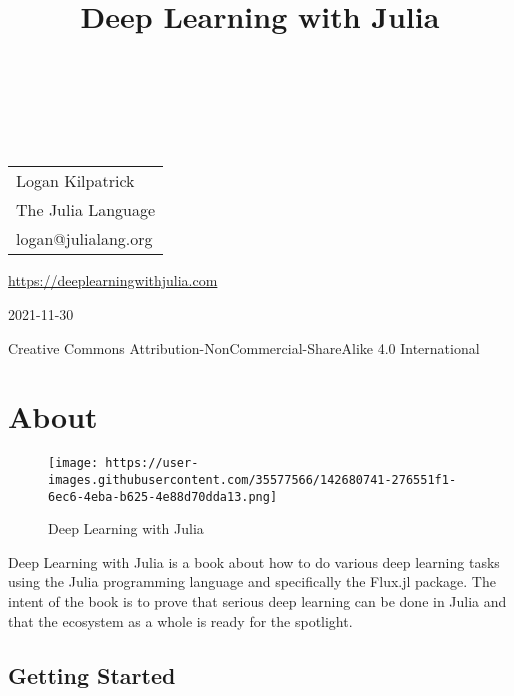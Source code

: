 \documentclass[
  notoc %
]{tufte-book}
\title{Deep Learning with Julia}
\author{\noindent{Logan Kilpatrick}\\[3mm] }
\date{}
\begin{document}
\makeatletter
\thispagestyle{empty}
\vfill
{\Huge\bf
\noindent
\@title
}\\[1in]
{\Large
\noindent
\@author
}
\makeatother

\makeatletter
\newpage
\thispagestyle{empty}
\vfill
{\noindent
\begin{tabular}{l} Logan Kilpatrick\\ The Julia Language\\ logan@julialang.org\\ \end{tabular}
}
\vfill
{\small
\url{https://deeplearningwithjulia.com}

2021-11-30

Creative Commons Attribution-NonCommercial-ShareAlike 4.0 International
}
\makeatother


\frontmatter
\mainmatter
{}

\setcounter{tocdepth}{1}
\tableofcontents

\justifying

\setlength{\parindent}{0pt}

\hypertarget{sec:about}{%
\chapter{About}\label{sec:about}}

\begin{figure}
\centering
\texttt{[image: https://user-images.githubusercontent.com/35577566/142680741-276551f1-6ec6-4eba-b625-4e88d70dda13.png]}
\caption{Deep Learning with Julia}
\end{figure}

Deep Learning with Julia is a book about how to do various deep learning
tasks using the Julia programming language and specifically the Flux.jl
package. The intent of the book is to prove that serious deep learning
can be done in Julia and that the ecosystem as a whole is ready for the
spotlight.

\hypertarget{getting-started}{%
\section{Getting Started}\label{getting-started}}
\end{document}
